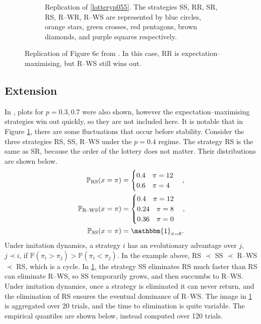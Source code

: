 \begin{figure}[!h]
\begin{subfigure}[b]{0.45\textwidth}
    \caption{Replication of \ref{lotteryp055}. The strategies SS, RR, SR, RS, R--WR, R--WS are represented by blue circles, orange stars, green crosses, red pentagons, brown diamonds, and purple squares respectively. }
    \label{lotteryp4_me}
  \end{subfigure}
  \caption{Replication of Figure 6c from \cite{RN30}. In this case, RR is expectation--maximising, but R--WS still wins out.} \label{lottery_comp5}
\end{figure} 
\FloatBarrier

\subsection{Extension}
In \cite{RN30}, plots for $p=0.3, 0.7$ were also shown, however the expectation--maximising strategies win out quickly, so they are not included here. It is notable that in Figure \ref{lotteryp4_me}, there are some fluctuations that occur before stability. Consider the three strategies RS, SS, R--WS under the $p=0.4$ regime. The strategy RS is the same as SR, because the order of the lottery does not matter. Their distributions are shown below. \\
\begin{align*}
    \mathbb P_{\text{RS}}(x = \pi)  &= \begin{cases} 0.4 \quad \pi = 12 \\
    0.6 \quad \pi =4 
    \end{cases}, \\
        \mathbb P_{\text{R--WS}}(x = \pi)  &= \begin{cases} 0.4 \quad \pi = 12 \\
    0.24 \quad \pi =8 \\
    0.36 \quad \pi = 0\\
    \end{cases}, \\
    \mathbb P_{\text{SS}}(x = \pi)  &= \mathbbm{1}_{\pi = 8}.
\end{align*}
Under imitation dynamics, a strategy $i$ has an evolutionary advantage over $j$, $j \prec i$, if $\mathbb P(\pi_i > \pi_j) > \mathbb P(\pi_i < \pi_j)$. In the example above, RS $\prec$ SS $\prec$ R--WS $\prec$ RS, which is a cycle. In \ref{lotteryp4_me}, the strategy SS eliminates RS much faster than RS can eliminate R--WS, so SS temporarily grows, and then succumbs to R--WS. Under imitation dynamics, once a strategy is eliminated it can never return, and the elimination of RS ensures the eventual dominance of R--WS. The image in \ref{lotteryp4_me} is aggregated over 20 trials, and the time to elimination is quite variable. The empirical quantiles are shown below, instead computed over 120 trials.  \\

